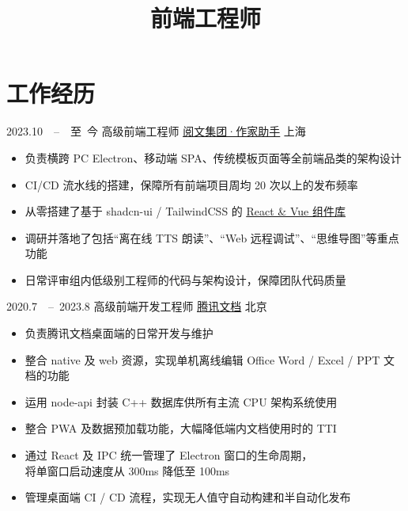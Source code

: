 \documentclass[12pt,a4paper,roman]{moderncv}   %
\title{前端工程师}                     %
\begin{document}
\maketitle


\section{工作经历}
\cventry
{2023.10\ \ –\ \ 至\ 今}
{高级前端工程师}
{\href{https://write.qq.com}{\underline{阅文集团·作家助手}}}
{上海}
{}
{
  \begin{itemize}
  \item 负责横跨 PC Electron、移动端 SPA、传统模板页面等全前端品类的架构设计
  \item CI/CD 流水线的搭建，保障所有前端项目周均 20 次以上的发布频率
  \item 从零搭建了基于 shadcn-ui / TailwindCSS 的 \href{https://stawritecdn.yuewen.com/document/docs/components/index.html}{\underline{React \& Vue 组件库}}
  \item 调研并落地了包括“离在线 TTS 朗读”、“Web 远程调试”、“思维导图”等重点功能
  \item 日常评审组内低级别工程师的代码与架构设计，保障团队代码质量
  \end{itemize}
}

\vspace{5pt}

\cventry
{2020.7\ \ –\ 2023.8}
{高级前端开发工程师}
{\href{https://docs.qq.com}{\underline{腾讯文档}}}
{北京}
{}
{
  \begin{itemize}
  \item 负责腾讯文档桌面端的日常开发与维护
  \item 整合 native 及 web 资源，实现单机离线编辑 Office Word / Excel / PPT 文档的功能
  \item 运用 node-api 封装 C++ 数据库供所有主流 CPU 架构系统使用 
  \item 整合 PWA 及数据预加载功能，大幅降低端内文档使用时的 TTI
  \item 通过 React 及 IPC 统一管理了 Electron 窗口的生命周期，\\将单窗口启动速度从 300ms 降低至 100ms
  \item 管理桌面端 CI / CD 流程，实现无人值守自动构建和半自动化发布
  \end{itemize}
}
\end{document}

